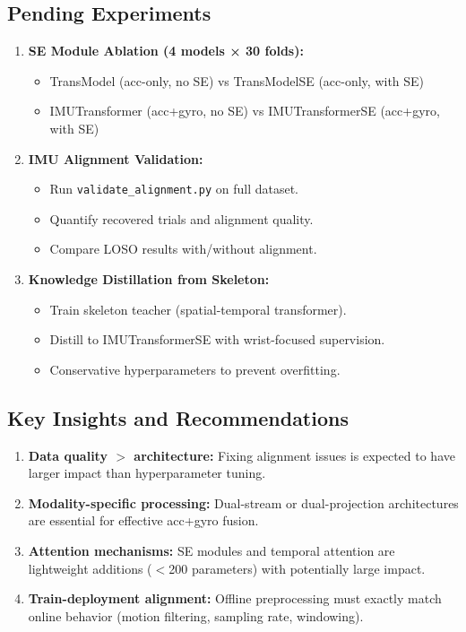 \subsection{Pending Experiments}

\begin{enumerate}
    \item \textbf{SE Module Ablation (4 models × 30 folds):}
    \begin{itemize}
        \item TransModel (acc-only, no SE) vs TransModelSE (acc-only, with SE)
        \item IMUTransformer (acc+gyro, no SE) vs IMUTransformerSE (acc+gyro, with SE)
    \end{itemize}
    
    \item \textbf{IMU Alignment Validation:}
    \begin{itemize}
        \item Run \texttt{validate\_alignment.py} on full dataset.
        \item Quantify recovered trials and alignment quality.
        \item Compare LOSO results with/without alignment.
    \end{itemize}
    
    \item \textbf{Knowledge Distillation from Skeleton:}
    \begin{itemize}
        \item Train skeleton teacher (spatial-temporal transformer).
        \item Distill to IMUTransformerSE with wrist-focused supervision.
        \item Conservative hyperparameters to prevent overfitting.
    \end{itemize}
\end{enumerate}

\subsection{Key Insights and Recommendations}

\begin{enumerate}
    \item \textbf{Data quality $>$ architecture:} Fixing alignment issues is expected to have larger impact than hyperparameter tuning.
    \item \textbf{Modality-specific processing:} Dual-stream or dual-projection architectures are essential for effective acc+gyro fusion.
    \item \textbf{Attention mechanisms:} SE modules and temporal attention are lightweight additions ($<$200 parameters) with potentially large impact.
    \item \textbf{Train-deployment alignment:} Offline preprocessing must exactly match online behavior (motion filtering, sampling rate, windowing).
\end{enumerate}

